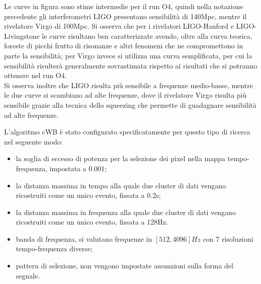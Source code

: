 Le curve in figura sono stime intermedie per il run O4, quindi nella notazione precedente gli interferometri LIGO presentano sensibilità di 140Mpc, mentre il rivelatore Virgo di 100Mpc.
Si osserva che per i rivelatori LIGO-Hanford e LIGO-Livingstone le curve risultano ben caratterizzate avendo, oltre alla curva teorica, foreste di picchi frutto di risonanze e altri fenomeni che ne compromettono in parte la sensibilità; per Virgo invece si utilizza una curva semplificata, per cui la sensibilità risulterà generalmente sovrastimata rispetto ai risultati che si potranno ottenere nel run O4.\\
Si osserva inoltre che LIGO risulta più sensibile a frequenze medio-basse, mentre le due curve si scambiano ad alte frequenze, dove il rivelatore Virgo risulta più sensibile grazie alla tecnica dello squeezing che permette di guadagnare sensibilità ad alte frequenze.

L'algoritmo cWB è stato configurato specificatamente per questo tipo di ricerca nel seguente modo:
\begin{itemize}
	\item la soglia di eccesso di potenza per la selezione dei pixel nella mappa tempo-frequenza, impostata a 0.001;
	\item la distanza massima in tempo alla quale due cluster di dati vengano ricostruiti come un unico evento, fissata a 0.2s;
	\item la distanza massima in frequenza alla quale due cluster di dati vengano ricostruiti come un unico evento, fissata a 128Hz.
	\item banda di frequenza, si valutano frequenze in $[512, 4096]Hz$ con 7 risoluzioni tempo-frequenza diverse;
	\item pattern di selezione, non vengono impostate assunzioni sulla forma del segnale.
\end{itemize}

